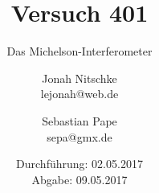 

\title{Versuch 401}
\subtitle{Das Michelson-Interferometer}
\author{Jonah Nitschke\\
        lejonah@web.de \and
        Sebastian Pape\\
        sepa@gmx.de}
\date{Durchführung: 02.05.2017\\
      Abgabe: 09.05.2017}



\maketitle
\newpage
\setcounter{page}{1}


\newpage


\printbibliography


